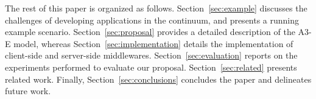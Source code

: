 The rest of this paper is organized as follows. Section~\ref{sec:example} discusses the challenges of developing applications in the continuum, and presents a running example scenario. Section~\ref{sec:proposal} provides a detailed description of the A3-E model, whereas Section~\ref{sec:implementation} details the implementation of client-side and server-side middlewares. Section~\ref{sec:evaluation} reports on the experiments performed to evaluate our proposal. Section~\ref{sec:related} presents related work. Finally, Section~\ref{sec:conclusions} concludes the paper and delineates future work.

